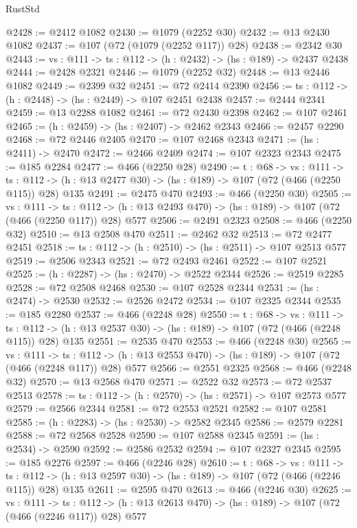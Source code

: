 \begin{lexlean}{RustStd}
\begin{coremodule}
@2428 := @2412 @1082
@2430 := @1079 (@2252 @30)
@2432 := @13 @2430 @1082
@2437 := @107 (@72 (@1079 (@2252 @117)) @28)
@2438 := @2342 @30
@2443 := {vs : @111} -> {ts : @112} -> (h : @2432) -> (hs : @189) -> @2437 @2438
@2444 := @2428 @2321
@2446 := @1079 (@2252 @32)
@2448 := @13 @2446 @1082
@2449 := @2399 @32
@2451 := @72 @2414 @2390
@2456 := {ts : @112} -> (h : @2448) -> (hs : @2449) -> @107 @2451 @2438
@2457 := @2444 @2341
@2459 := @13 @2288 @1082
@2461 := @72 @2430 @2398
@2462 := @107 @2461
@2465 := (h : @2459) -> (hs : @2407) -> @2462 @2343
@2466 := @2457 @2290
@2468 := @72 @2446 @2405
@2470 := @107 @2468 @2343
@2471 := (hs : @2411) -> @2470
@2472 := @2466 @2409
@2474 := @107 @2323 @2343
@2475 := @185 @2284
@2477 := @466 (@2250 @28)
@2490 := {t : @68} ->
  {vs : @111} ->
  {ts : @112} -> (h : @13 @2477 @30) -> (hs : @189) -> @107 (@72 (@466 (@2250 @115)) @28) @135
@2491 := @2475 @470
@2493 := @466 (@2250 @30)
@2505 := {vs : @111} ->
  {ts : @112} -> (h : @13 @2493 @470) -> (hs : @189) -> @107 (@72 (@466 (@2250 @117)) @28) @577
@2506 := @2491 @2323
@2508 := @466 (@2250 @32)
@2510 := @13 @2508 @470
@2511 := @2462 @32
@2513 := @72 @2477 @2451
@2518 := {ts : @112} -> (h : @2510) -> (hs : @2511) -> @107 @2513 @577
@2519 := @2506 @2343
@2521 := @72 @2493 @2461
@2522 := @107 @2521
@2525 := (h : @2287) -> (hs : @2470) -> @2522 @2344
@2526 := @2519 @2285
@2528 := @72 @2508 @2468
@2530 := @107 @2528 @2344
@2531 := (hs : @2474) -> @2530
@2532 := @2526 @2472
@2534 := @107 @2325 @2344
@2535 := @185 @2280
@2537 := @466 (@2248 @28)
@2550 := {t : @68} ->
  {vs : @111} ->
  {ts : @112} -> (h : @13 @2537 @30) -> (hs : @189) -> @107 (@72 (@466 (@2248 @115)) @28) @135
@2551 := @2535 @470
@2553 := @466 (@2248 @30)
@2565 := {vs : @111} ->
  {ts : @112} -> (h : @13 @2553 @470) -> (hs : @189) -> @107 (@72 (@466 (@2248 @117)) @28) @577
@2566 := @2551 @2325
@2568 := @466 (@2248 @32)
@2570 := @13 @2568 @470
@2571 := @2522 @32
@2573 := @72 @2537 @2513
@2578 := {ts : @112} -> (h : @2570) -> (hs : @2571) -> @107 @2573 @577
@2579 := @2566 @2344
@2581 := @72 @2553 @2521
@2582 := @107 @2581
@2585 := (h : @2283) -> (hs : @2530) -> @2582 @2345
@2586 := @2579 @2281
@2588 := @72 @2568 @2528
@2590 := @107 @2588 @2345
@2591 := (hs : @2534) -> @2590
@2592 := @2586 @2532
@2594 := @107 @2327 @2345
@2595 := @185 @2276
@2597 := @466 (@2246 @28)
@2610 := {t : @68} ->
  {vs : @111} ->
  {ts : @112} -> (h : @13 @2597 @30) -> (hs : @189) -> @107 (@72 (@466 (@2246 @115)) @28) @135
@2611 := @2595 @470
@2613 := @466 (@2246 @30)
@2625 := {vs : @111} ->
  {ts : @112} -> (h : @13 @2613 @470) -> (hs : @189) -> @107 (@72 (@466 (@2246 @117)) @28) @577

\end{coremodule}
\end{lexlean}
